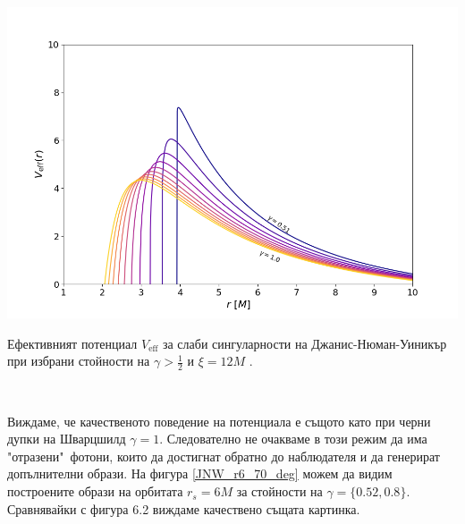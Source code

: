 \begin{minipage}{18em}
	\hspace{-0.5cm}
	\includegraphics[scale = 0.3]{JNW_eff_potential_photon_sphere.png}
	\caption[Ефективният потенциал за слаби сингуларности на Джанис-Нюман-Уиникър]{Ефективният потенциал $V_\text{eff}$ за слаби сингуларности на Джанис-Нюман-Уиникър при избрани стойности на $\gamma > \frac{1}{2}$ и $\xi = 12M$ \cite{Gyulchev2020}.}
\end{minipage}\,\,
\begin{minipage}{18em}
	Виждаме, че качественото поведение на потенциала е същото като при черни дупки на Шварцшилд $\gamma = 1$. Следователно не очакваме в този режим да има "отразени"$\,$ фотони, които да достигнат обратно до наблюдателя и да генерират допълнителни образи. На фигура \ref{JNW_r6_70_deg} можем да видим построените образи на орбитата $r_s = 6M$ за стойности на $\gamma = \{0.52, 0.8\}$. Сравнявайки с фигура 6.2 виждаме качествено същата картинка.
\end{minipage}
